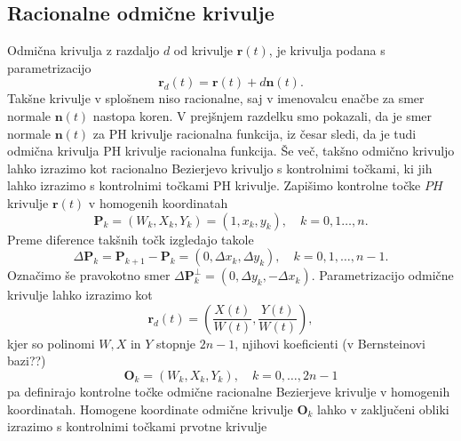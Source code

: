 \documentclass[isrm2, tisk]{fmfdelo}
\begin{document}
    \subsection{Racionalne odmične krivulje}
    Odmična krivulja z razdaljo $d$ od krivulje $\mathbf{r}(t)$, je krivulja podana s parametrizacijo \[\mathbf{r}_d(t)=\mathbf{r}(t) + d\mathbf{n}(t).\]
    Takšne krivulje v splošnem niso racionalne, saj v imenovalcu enačbe za smer normale $\mathbf{n}(t)$ nastopa koren.
    V prejšnjem razdelku smo pokazali, da je smer normale $\mathbf{n}(t)$ za PH krivulje racionalna funkcija, iz česar sledi, da je tudi odmična krivulja PH krivulje racionalna funkcija.
    Še več, takšno odmično krivuljo lahko izrazimo kot racionalno Bezierjevo krivuljo s kontrolnimi točkami, ki jih lahko izrazimo s kontrolnimi točkami PH krivulje.
    Zapišimo kontrolne točke $PH$ krivulje $\mathbf{r}(t)$ v homogenih koordinatah
    \[\mathbf{P}_k = (W_k,X_k,Y_k) = (1,x_k,y_k), \quad k=0,1\ldots,n. \]
    Preme diference takšnih točk izgledajo takole
    \[\Delta\mathbf{P}_k = \mathbf{P}_{k+1}-\mathbf{P}_k = (0,\Delta x_k,\Delta y_k), \quad k=0,1,\ldots,n-1.\]
    Označimo še pravokotno smer $\Delta\mathbf{P}_k^{\perp} =  (0,\Delta y_k, -\Delta x_k)$.
    Parametrizacijo odmične krivulje lahko izrazimo kot
    \[\mathbf{r}_d(t)=\left(\frac{X(t)}{W(t)}, \frac{Y(t)}{W(t)}\right),\]
    kjer so polinomi $W,X$ in $Y$ stopnje $2n-1$, njihovi koeficienti (v Bernsteinovi bazi??)
    \[\mathbf{O}_k=(W_k,X_k,Y_k),\quad k=0,\ldots,2n-1  \]
    pa definirajo kontrolne točke odmične racionalne Bezierjeve krivulje v homogenih koordinatah.
    Homogene koordinate odmične krivulje $\mathbf{O}_k$ lahko v zaključeni obliki izrazimo s kontrolnimi točkami prvotne krivulje
\end{document}
